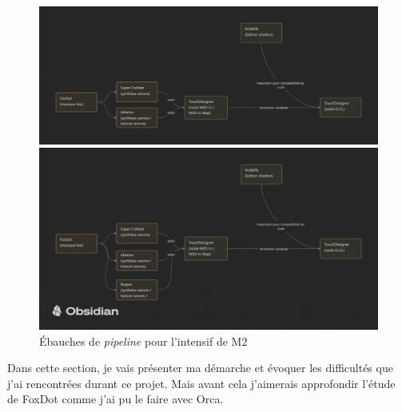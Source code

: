 \begin{figure}[h]
  \begin{minipage}[b]{0.45\linewidth}
    \centering
    \includegraphics[width=\linewidth]{images/experiments/intensifs/intensifs00.png}
  \end{minipage}
  \hspace{0.1\linewidth} %
  \begin{minipage}[b]{0.45\linewidth}
    \centering
    \includegraphics[width=\linewidth]{images/experiments/intensifs/intensifs01.png}
  \end{minipage}
  \caption{Ébauches de \textit{pipeline} pour l'intensif de M2}
  \label{intensifs00}
\end{figure}


Dans cette section, je vais présenter ma démarche et évoquer les difficultés que j'ai rencontrées durant ce projet. Mais avant cela j'aimerais approfondir l'étude de FoxDot comme j'ai pu le faire avec Orca.

